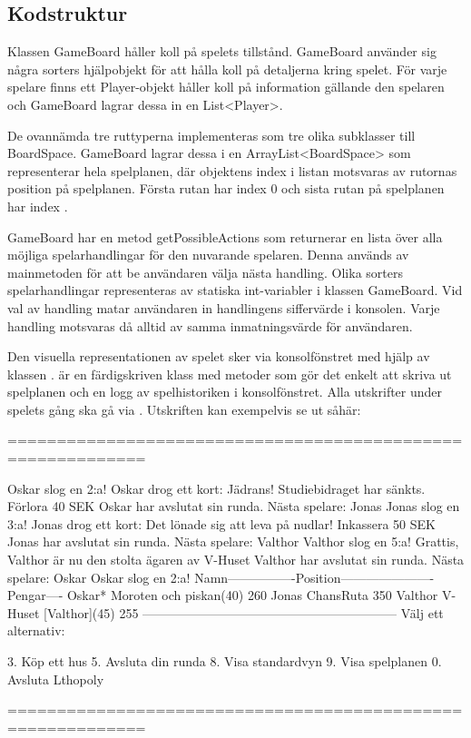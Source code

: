 \subsection{Kodstruktur}
Klassen GameBoard håller koll på spelets tillstånd.
GameBoard använder sig några sorters hjälpobjekt för att hålla koll på detaljerna kring spelet. 
För varje spelare finns ett Player-objekt håller koll på information gällande den spelaren och GameBoard lagrar dessa in en List<Player>.

De ovannämda tre ruttyperna implementeras som tre olika subklasser till BoardSpace. GameBoard lagrar dessa i en ArrayList<BoardSpace> som representerar hela spelplanen, där objektens index i listan motsvaras av rutornas position på spelplanen. Första rutan har index 0 och sista rutan på spelplanen har index .

GameBoard har en metod getPossibleActions som returnerar en lista över alla möjliga spelarhandlingar för den nuvarande spelaren. Denna används av mainmetoden för att be användaren välja nästa handling. 
Olika sorters spelarhandlingar representeras av statiska int-variabler i klassen GameBoard. Vid val av handling matar användaren in handlingens siffervärde i konsolen. Varje handling motsvaras då alltid av samma inmatningsvärde för användaren.




Den visuella representationen av spelet sker via konsolfönstret med hjälp av klassen .  är en färdigskriven klass med metoder som gör det enkelt att skriva ut spelplanen och en logg av spelhistoriken i konsolfönstret.
Alla utskrifter under spelets gång ska gå via .
\newline
Utskriften kan exempelvis se ut såhär:

\begin{REPL}
============================================================

Oskar slog en 2:a!
Oskar drog ett kort: Jädrans! Studiebidraget har sänkts. Förlora 40 SEK
Oskar har avslutat sin runda.
Nästa spelare: Jonas
Jonas slog en 3:a!
Jonas drog ett kort: Det lönade sig att leva på nudlar! Inkassera 50 SEK
Jonas har avslutat sin runda.
Nästa spelare: Valthor
Valthor slog en 5:a!
Grattis, Valthor är nu den stolta ägaren av V-Huset
Valthor har avslutat sin runda.
Nästa spelare: Oskar
Oskar slog en 2:a!
Namn----------------Position----------------------Pengar----
Oskar*              Moroten och piskan(40)        260       
Jonas               ChansRuta                     350       
Valthor             V-Huset [Valthor](45)         255       
------------------------------------------------------------
Välj ett alternativ:

	3. Köp ett hus                   
	5. Avsluta din runda             
	8. Visa standardvyn              
	9. Visa spelplanen               
	0. Avsluta Lthopoly              

============================================================

\end{REPL}

